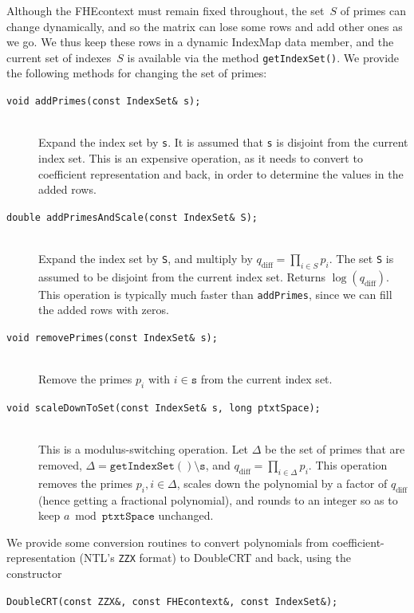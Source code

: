 \documentclass[14pt]{extarticle}
\def\IndexMap{\textsf{IndexMap}}
\def\DoubleCRT{\textsf{DoubleCRT}}
\def\FHEcontext{\textsf{FHEcontext}}
\begin{document}
Although the {\FHEcontext} must remain fixed throughout, the set~$S$
of primes can change dynamically, and so the matrix can lose some rows
and add other ones as we go. We thus keep these rows in a dynamic
{\IndexMap} data member, and the current set of indexes~$S$ is
available via the method \texttt{getIndexSet()}. We provide the
following methods for changing the set of primes:
\begin{description}
\item[\texttt{void addPrimes(const IndexSet\& s);}]\ \\
Expand the index set by \texttt{s}. It is assumed that \texttt{s} is
disjoint from the current index set. This is an expensive operation,
as it needs to convert to coefficient representation and back, in
order to determine the values in the added rows.
  
\item[\texttt{double addPrimesAndScale(const IndexSet\& S);}]\ \\
Expand the index set by \texttt{S}, and multiply by $q_{\mathrm{diff}}
=\prod_{i \in S}p_i$. The set \texttt{S} is assumed to be disjoint
from the current index set. Returns $\log(q_{\mathrm{diff}})$. This
operation is typically much faster than \texttt{addPrimes}, since we
can fill the added rows with zeros.

\item[\texttt{void removePrimes(const IndexSet\& s);}]\ \\
Remove the primes $p_i$ with $i\in\mathtt{s}$ from the current
index set.

\item[\texttt{void scaleDownToSet(const IndexSet\& s, long ptxtSpace);}]\ \\
This is a modulus-switching operation. Let $\Delta$ be the set of
primes that are removed, $\Delta=\mathtt{getIndexSet()\setminus s}$,
and  $q_{\mathrm{diff}}=\prod_{i \in \Delta}p_i$. This operation
removes the primes $p_i, i\in\Delta$, scales down the polynomial by a
factor of $q_{\mathrm{diff}}$ (hence getting a fractional polynomial),
and rounds to an integer so as to keep $a \bmod\mathtt{ptxtSpace}$
unchanged.
\end{description}

We provide some conversion routines to convert polynomials from
coefficient-representation (NTL's \texttt{ZZX} format) to {\DoubleCRT}
and back, using the constructor 

\smallskip
\texttt{DoubleCRT(const ZZX\&, const FHEcontext\&, const IndexSet\&);}
\end{document}

